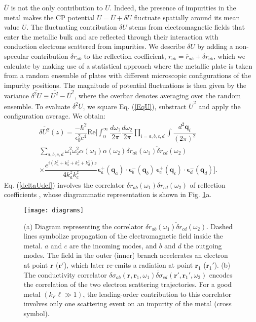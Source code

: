 \documentclass[doublecol]{epl2}
\newcommand{\bs}[1]{{\boldsymbol{#1}}}
\newcommand{\bq}{\bs{q}}
\newcommand{\be}{\bs{\epsilon}}
\begin{document}
$\overline{U}$ is not the only contribution to $U$. Indeed, the presence of impurities in the metal makes  the CP potential $U=\overline{U}+\delta U$ fluctuate spatially around its mean value $\overline{U}$. The fluctuating contribution $\delta U$ stems from electromagnetic fields that enter the metallic bulk  and are reflected through their interaction with conduction electrons scattered from impurities. We describe $\delta U$ by adding a non-specular contribution $\delta r_{ab}$ to the reflection coefficient, $r_{ab}=\overline{r}_{ab}+\delta r_{ab}$, which we calculate by making use of a statistical approach where the metallic plate is taken from a random ensemble of plates with different microscopic configurations of the impurity positions. The magnitude of potential fluctuations is then given by the variance $\overline{\delta^2U}\equiv \overline{U^2}-\overline{U}^2$, where the overbar denotes averaging over the random ensemble. 
To evaluate $\overline{\delta^2U}$, we square Eq. (\ref{EqU}), substract $\overline{U}^2$ and apply the configuration average. We obtain:
\begin{equation}
\begin{split}
\label{deltaUdef}
\overline{\delta U^2}(z)=\dfrac{-\hbar^2}{\epsilon_0^2c^4}
\text{Re}\bigg[
\int_0^\infty\dfrac{d\omega_1}{2\pi}\dfrac{d\omega_2}{2\pi}
\!\!\prod_{i=a,b,c,d}\!\int\dfrac{d ^2\bq_i}{(2\pi)^2}
\\
\sum_{a, b, c, d} \omega_1^2\omega_2^2
\alpha(\omega_1)\alpha(\omega_2)
\overline{\delta r_{ab}(\omega_1)\delta r_{cd}(\omega_2)}
\\
\times\dfrac{e^{i(k_a^z+k_b^z+k_c^{z}+k_d^{z})z}}{4k_{a}^zk_{c}^{z}} 
\be_a^+(\bq_a)\!\cdot\!\be_b^-(\bq_b)
\,\be_c^+(\bq_c)\!\cdot\!\be_d^-(\bq_d)
\bigg].
\end{split}
\end{equation}
Eq. (\ref{deltaUdef}) involves the correlator $\overline{\delta r_{ab}(\omega_1)\delta r_{cd}(\omega_2)}$ of reflection coefficients \cite{Cherroret15}, whose diagrammatic representation is shown in Fig. \ref{diagrams}a.
\begin{figure}[h]
\texttt{[image: diagrams]}
\caption{
\label{diagrams}
(a) Diagram representing the correlator $\overline{\delta r_{ab}(\omega_1)\delta r_{cd}(\omega_2)}$. Dashed lines symbolize propagation of the electromagnetic field inside the metal. $a$ and $c$ are the incoming modes, and $b$ and $d$ the outgoing modes. The field in the outer (inner) branch accelerates an electron at point $\textbf{r}$ ($\textbf{r}'$), which later re-emits a radiation at point $\textbf{r}_1$ ($\textbf{r}_1'$). (b) The conductivity correlator $\overline{\delta \sigma_{ab}(\textbf{r},\textbf{r}_1,\omega_1)\delta \sigma_{cd}(\textbf{r}',\textbf{r}_1',\omega_2)}$ encodes the correlation of the two electron scattering trajectories.
For a good metal $(k_F\ell \gg 1)$, the leading-order contribution to this correlator involves only one scattering event on an impurity of the metal (cross symbol). }
\end{figure}
\end{document}
